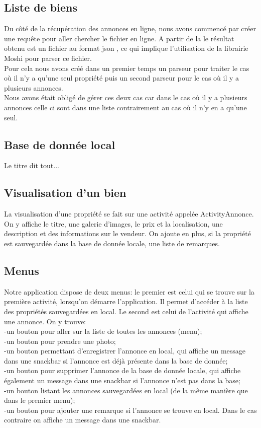 \documentclass[a4paper,12pt]{article} %
\begin{document}
\subsection{Liste de biens}
Du côté de la récupération des annonces en ligne, nous avons commencé par créer une requête pour aller chercher le fichier en ligne.
A partir de la le résultat obtenu est un fichier au format json , ce qui implique l'utilisation de la librairie Moshi pour parser ce fichier. \\
Pour cela nous avons créé dans un premier temps un parseur pour traiter le cas où il n'y a qu'une seul propriété puis un second parseur pour le cas où il y a plusieurs annonces.\\
Nous avons était obligé de gérer ces deux cas car dans le cas où il y a plusieurs annonces celle ci sont dans une liste contrairement au cas où il n'y en a qu'une seul.

\subsection{Base de donnée local}
Le titre dit tout...

\subsection{Visualisation d'un bien}
La visualisation d'une propriété se fait sur une activité appelée ActivityAnnonce.
On y affiche le titre, une galerie d'images, le prix et la localisation, une description et des informations sur le vendeur. On ajoute en plus, si la propriété est sauvegardée dans la base de donnée locale, une liste de remarques.

\subsection{Menus}
Notre application dispose de deux menus: le premier est celui qui se trouve sur la première activité, lorsqu'on démarre l'application. Il permet d'accéder à la liste des propriétés sauvegardées en local. Le second est celui de l'activité qui affiche une annonce. On y trouve:\\
    -un bouton pour aller sur la liste de toutes les annonces (menu);\\
    -un bouton pour prendre une photo;\\
    -un bouton permettant d'enregistrer l'annonce en local, qui affiche un message dans une snackbar si l'annonce est déjà présente dans la base de donnée;\\
    -un bouton pour supprimer l'annonce de la base de donnée locale, qui affiche également un message dans une snackbar si l'annonce n'est pas dans la base;\\
    -un bouton listant les annonces sauvegardées en local (de la même manière que dans le premier menu);\\
    -un bouton pour ajouter une remarque si l'annonce se trouve en local. Dans le cas contraire on affiche un message dans une snackbar.
\end{document}
